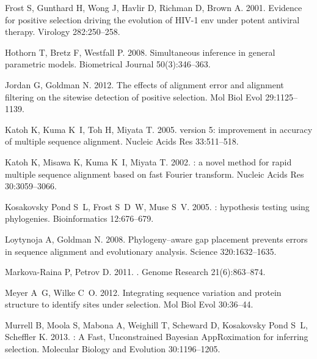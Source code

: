 \documentclass[11pt]{article}
\begin{document}
\begin{thebibliography}{27}
Frost S, Gunthard H, Wong J, Havlir D, Richman D, Brown A. 2001.
\newblock Evidence for positive selection driving the evolution of {HIV-1 env}
  under potent antiviral therapy.
\newblock Virology 282:250--258.

Hothorn T, Bretz F, Westfall P. 2008.
\newblock Simultaneous inference in general parametric models.
\newblock Biometrical Journal 50(3):346--363.

Jordan G, Goldman N. 2012.
\newblock The effects of alignment error and alignment filtering on the
  sitewise detection of positive selection.
\newblock Mol Biol Evol 29:1125--1139.

Katoh K, Kuma K~I, Toh H, Miyata T. 2005.
 version 5: improvement in accuracy of multiple sequence
  alignment.
\newblock Nucleic Acids Res 33:511--518.

Katoh K, Misawa K, Kuma K~I, Miyata T. 2002.
: a novel method for rapid multiple sequence alignment based
  on fast {F}ourier transform.
\newblock Nucleic Acids Res 30:3059--3066.

{Kosakovsky Pond} S~L, Frost S~D~W, Muse S~V. 2005.
: hypothesis testing using phylogenies.
\newblock Bioinformatics 12:676--679.

Loytynoja A, Goldman N. 2008.
\newblock Phylogeny--aware gap placement prevents errors in sequence alignment
  and evolutionary analysis.
\newblock Science 320:1632--1635.

Markova-Raina P, Petrov D. 2011.
.
\newblock Genome Research 21(6):863--874.

Meyer A~G, Wilke C~O. 2012.
\newblock Integrating sequence variation and protein structure to identify
  sites under selection.
\newblock Mol Biol Evol 30:36--44.

Murrell B, Moola S, Mabona A, Weighill T, Scheward D, {Kosakovsky Pond} S~L,
  Scheffler K. 2013.
: A {F}ast, {U}nconstrained {B}ayesian {A}pp{R}oximation for
  inferring selection.
\newblock Molecular Biology and Evolution 30:1196--1205.


\end{thebibliography}
\end{document}
